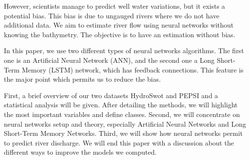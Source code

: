However, scientists manage to predict well water variations, but it exists a potential bias. This bias is due to ungauged rivers where we do not have additional data. We aim to estimate river flow using neural networks without knowing the bathymetry. The objective is to have an estimation without bias.\newline

In this paper, we use two different types of neural networks algorithms. The first one is an Artificial Neural Network (ANN), and the second one a Long Short-Term Memory (LSTM) network, which has feedback connections. This feature is the major point which permits us to reduce the bias.

First, a brief overview of our two datasets HydroSwot and PEPSI and a statistical analysis will be given. After detailing the methods, we will highlight the most important variables and define classes.  Second, we will concentrate on neural networks setup and theory, especially Artificial Neural Networks and Long Short-Term Memory Networks. Third, we will show how neural networks permit to predict river discharge. We will end this paper with a discussion about the different ways to improve the models we computed.

